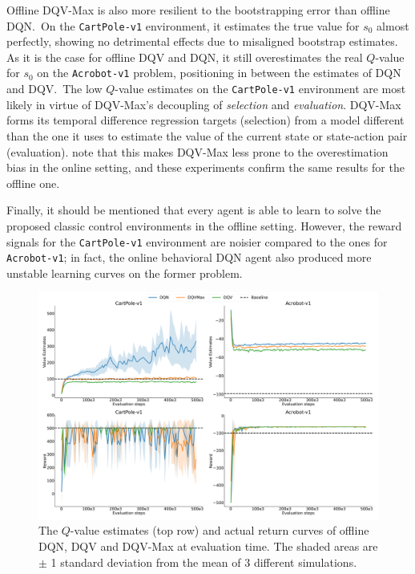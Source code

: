 Offline DQV-Max is also more resilient to the bootstrapping error than
offline DQN.\ On the \texttt{CartPole-v1} environment, it estimates
the true value for $s_0$ almost perfectly, showing no detrimental
effects due to misaligned bootstrap estimates. As it is the case for
offline DQV and DQN, it still overestimates the real $Q$-value for
$s_0$ on the \texttt{Acrobot-v1} problem, positioning in between the
estimates of DQN and DQV.\ The low $Q$-value estimates on the
\texttt{CartPole-v1} environment are most likely in virtue of
DQV-Max's decoupling of \textit{selection} and \textit{evaluation}.
DQV-Max forms its temporal difference regression targets (selection)
from a model different than the one it uses to estimate the value of
the current state or state-action pair
(evaluation). \citet{sabatelli2020deep} note that this makes DQV-Max
less prone to the overestimation bias in the online setting, and these
experiments confirm the same results for the offline one.

Finally, it should be mentioned that every agent is able to
learn to solve the proposed classic control environments in the
offline setting.
However, the reward signals for the
\texttt{CartPole-v1} environment are noisier compared to the ones for
\texttt{Acrobot-v1}; in fact, the online behavioral DQN agent also
produced more unstable learning curves on the former problem.







\begin{figure}[!tbp]
  \centering
  \includegraphics[width=.5\textwidth]{img/dshift_plots_normal.png}
  \caption{The $Q$-value estimates (top row) and actual return curves
    of offline DQN, DQV and DQV-Max at evaluation time. The shaded
    areas are $\pm$ 1 standard deviation from the mean of 3 different
    simulations.}\label{fig:dshift_offline_normal}
\end{figure}

